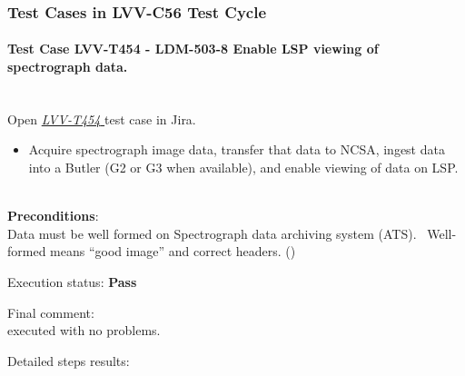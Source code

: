 \documentclass[DM,STR,toc]{lsstdoc}
\providecommand{\tightlist}{
  \setlength{\itemsep}{0pt}\setlength{\parskip}{0pt}}
\begin{document}
\subsubsection{Test Cases in LVV-C56 Test Cycle}

\paragraph{Test Case LVV-T454 - LDM-503-8 Enable LSP viewing of spectrograph data.
 }\mbox{}\\

Open  \href{https://jira.lsstcorp.org/secure/Tests.jspa#/testCase/LVV-T454}{\textit{ LVV-T454 } }
test case in Jira.

\begin{itemize}
\tightlist
\item
  Acquire spectrograph image data, transfer that data to NCSA, ingest
  data into a Butler (G2 or G3 when available), and enable viewing of
  data on LSP. ~
\end{itemize}


\textbf{ Preconditions}:\\
Data must be well formed on Spectrograph data archiving system (ATS).
~Well-formed means ``good image'' and correct headers. () ~


Execution status: {\bf Pass }

Final comment:\\executed with no problems.~



Detailed steps results:
\end{document}
